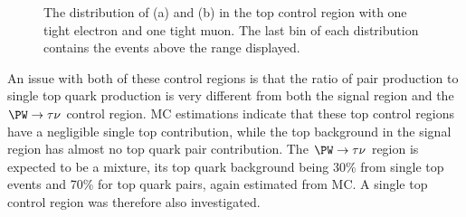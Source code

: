 \begin{figure}
  \caption{The distribution of \jetmetdphi (a) and \Mjj (b) in the top control region with one tight electron and one tight muon. The last bin of each distribution contains the events above the range displayed.}
  \label{fig:parkedtopjetmetdphi}
\end{figure}


An issue with both of these control regions is that the ratio of pair production to single top quark production is very different from both the signal region and the $\PW\rightarrow\tau\nu$ control region. \ac{MC} estimations indicate that these top control regions have a negligible single top contribution, while the top background in the signal region has almost no top quark pair contribution. The $\PW\rightarrow\tau\nu$ region is expected to be a mixture, its top quark background being 30\% from single top events and 70\% for top quark pairs, again estimated from \ac{MC}. A single top control region was therefore also investigated.

